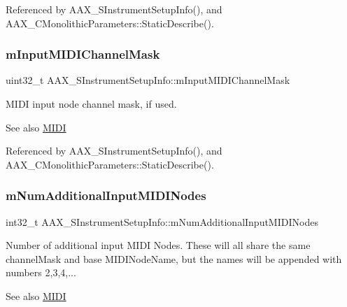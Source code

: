 Referenced by A\+A\+X\+\_\+\+S\+Instrument\+Setup\+Info(), and A\+A\+X\+\_\+\+C\+Monolithic\+Parameters\+::\+Static\+Describe().

\mbox{\label{a01957_acfc35506cfa94a358411aade13070109}} 
\subsubsection{\texorpdfstring{mInputMIDIChannelMask}{mInputMIDIChannelMask}}
{\footnotesize\ttfamily uint32\+\_\+t A\+A\+X\+\_\+\+S\+Instrument\+Setup\+Info\+::m\+Input\+M\+I\+D\+I\+Channel\+Mask}



M\+I\+DI input node channel mask, if used. 

\begin{DoxySeeAlso}{See also}
\mbox{\hyperlink{a00806}{M\+I\+DI}} 
\end{DoxySeeAlso}


Referenced by A\+A\+X\+\_\+\+S\+Instrument\+Setup\+Info(), and A\+A\+X\+\_\+\+C\+Monolithic\+Parameters\+::\+Static\+Describe().

\mbox{\label{a01957_a256b7a612ed6ff827d47d8ea5b7c0968}} 
\subsubsection{\texorpdfstring{mNumAdditionalInputMIDINodes}{mNumAdditionalInputMIDINodes}}
{\footnotesize\ttfamily int32\+\_\+t A\+A\+X\+\_\+\+S\+Instrument\+Setup\+Info\+::m\+Num\+Additional\+Input\+M\+I\+D\+I\+Nodes}



Number of additional input M\+I\+DI Nodes. These will all share the same channel\+Mask and base M\+I\+D\+I\+Node\+Name, but the names will be appended with numbers 2,3,4,... 

\begin{DoxySeeAlso}{See also}
\mbox{\hyperlink{a00806}{M\+I\+DI}} 
\end{DoxySeeAlso}


